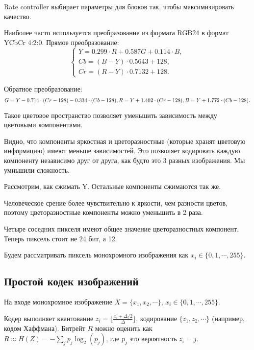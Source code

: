 {Rate controller выбирает параметры для блоков так, чтобы максимизировать
качество.

Наиболее часто используется преобразование из формата RGB24 в формат YCbCr
4:2:0. Прямое преобразование:
\[
    \begin{cases}
        Y = 0.299 \cdot R + 0.587 G + 0.114 \cdot B,\\
        Cb = (B - Y) \cdot 0.5643 + 128,\\
        Cr = (R - Y) \cdot 0.7132 + 128.
    \end{cases}
\]

Обратное преобразование:
\[
    G = Y - 0.714 \cdot (Cr - 128) - 0.334 \cdot (Cb - 128),\\
    R = Y + 1.402 \cdot (Cr - 128),\\
    B = Y + 1.772 \cdot (Cb - 128).
\]

Такое цветовое пространство позволяет уменьшить зависимость между цветовыми
компонентами.


Видно, что компоненты яркостная и цветоразностные (которые хранят цветовую
информацию) имеют меньше зависимостей. Это позволяет кодировать каждую
компоненту независимо друг от друга, как будто это 3 разных изображения. Мы
умньшили сложность.

Рассмотрим, как сжимать Y. Остальные компоненты сжимаются так же.

Человеческое срение более чувствительно к яркости, чем разности цветов, поэтому
цветоразностные компоненты можно уменьшить в 2 раза.

Четыре соседних пикселя имеют общее значение цветоразностных компонент. Теперь
пиксель стоит не 24 бит, а 12.


Будем рассматривать пиксель монохромного изображения как $x_i \in \{0, 1,
\cdots, 255\}$.

\subsection{Простой кодек изображений}

На входе монохромное изображение $X = \{x_1, x_2, \cdots\}$, $x_i \in \{0, 1,
\cdots, 255\}$.

Кодер выполняет квантование $z_i = \lfloor \frac{x_i + \Delta / 2}{\Delta}
\rfloor$, кодирование $\{z_1, z_2, \cdots \}$ (например, кодом Хаффмана).
Битрейт $R$ можно оценить как $R \approx H(Z) = - \sum_j p_j \log_2(p_j)$, где
$p_j$ это вероятность $z_i = j$.

}
